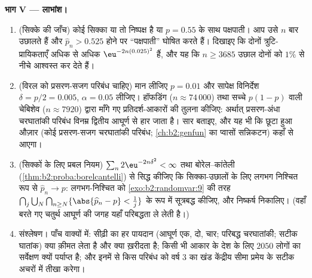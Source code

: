 \begin{problem}
\medskip
\noindent\textbf{भाग V --- लाभांश।}
\begin{enumerate}[resume]
  \item (सिक्के की जाँच) कोई सिक्का या तो निष्पक्ष है या $p = 0.55$
        के साथ पक्षपाती। आप उसे $n$ बार उछालते हैं और $\widehat p_n > 0.525$ होने
        पर ``पक्षपाती'' घोषित करते हैं। दिखाइए कि दोनों
        त्रुटि-प्रायिकताएँ अधिक से अधिक $\eu^{-2n(0.025)^2}$ हैं, और यह कि $n \geq 3685$
        उछाल दोनों को $1\%$ से नीचे आश्वस्त कर देते हैं।
  \item (विरल  को प्रसरण-सजग परिबंध चाहिए) मान लीजिए $p =
        0.01$
        और सापेक्ष विनिर्देश $\delta =
        p/2 = 0.005$, $\alpha = 0.05$ लीजिए। हॉफडिंग ($n \approx 74\,000$)
        तथा सच्चे  $p(1-p)$ वाली चेबिशेव ($n
        \approx 7920$) द्वारा
        माँगे गए प्रतिदर्श-आकारों की तुलना कीजिए: अर्थात्
        प्रसरण-अंधा चरघातांकी परिबंध विनम्र द्वितीय आघूर्ण से
        हार जाता है। सार बताइए, और यह भी कि छूटा हुआ औज़ार (कोई
        प्रसरण-सजग चरघातांकी परिबंध; \cref{ch:b2:genfun} का प्वासों
        सन्निकटन) कहाँ से आएगा।
  \item (सिक्कों के लिए प्रबल नियम) $\sum_n
        2\eu^{-2n\delta^2} < \infty$ तथा बोरेल--कांतेली
        (\cref{thm:b2:proba:borelcantelli}) से सिद्ध कीजिए कि  सिक्का-उछालों के लिए
        लगभग निश्चित रूप से $\widehat p_n \to p$: लगभग-निश्चित  को \cref{exo:b2:randomvar:9}
        की तरह $\bigcap_j\bigcup_N\bigcap_{n\geq N}
        \{\abs{\widehat p_n - p} < \tfrac1j\}$ के रूप में सूत्रबद्ध कीजिए, और निष्कर्ष
        निकालिए। (वहाँ बरते गए चतुर्थ आघूर्ण की जगह यहाँ
        परिबद्धता ले लेती है।)
  \item संश्लेषण। पाँच वाक्यों में: सीढ़ी का हर पायदान (आघूर्ण
        एक, दो, चार; परिबद्ध चरघातांकी; सटीक घातांक) क्या
        क़ीमत लेता है और क्या ख़रीदता है; किसी भी आकार के देश
        के लिए $2050$ लोगों का सर्वेक्षण क्यों पर्याप्त है; और
        इनमें से किस परिबंध को वर्ष 3 का खंड केंद्रीय सीमा
        प्रमेय के सटीक अचरों में तीखा करेगा।
\end{enumerate}
\end{problem}

